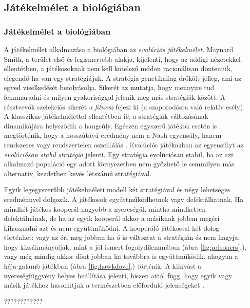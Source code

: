 \subsection{Játékelmélet a biológiában}
\begin{frame}
\frametitle{Játékelmélet a biológiában}
A játékelmélet alkalmazása a biológiában az \textit{evolúciós játékelmélet}. Maynard Smith, a terület első és legismertebb alakja, kijelenti, hogy az addigi nézetekkel ellentétben, a játékosoknak nem kell kötelező módon racionálisan dönteniük, elegendő ha van egy stratégiájuk. A stratégia genetikailag örökölt jelleg, ami az egyed viselkedését befolyásolja. Sikerét az mutatja, hogy mennyire tud fennmaradni és milyen gyakorisággal jelenik meg más stratégiák között. A résztvevők szelekciós sikerét a \textit{fitnesz} fejezi ki (a szaporodásra való relatív esély). A klasszikus játékelmélettel ellentétben itt a stratégiák változásának dinamikájára helyeződik a hangsúly. Egészen egyszerű játékok esetén is megtörténik, hogy a hosszútávú eredmény nem a Nash-egyensúly, hanem rendszeres vagy rendszertelen oszcillálás \cite{nowak2004evolutionary}. Evolúciós játékokban az egyensúlyt az \textit{evolúciósan stabil stratégia} jelenti. Egy stratégia evolúciósan stabil, ha az azt alkalmazó populáció egy adott környezetben nem győzhető le semmilyen más alternatív, kezdetben kevés létszámú stratégiával.
 
Egyik legegyszerűbb játékelméleti modell két stratégiával és négy lehetséges eredménnyel dolgozik. A játékosok együttműködhetnek vagy defektálhatnak. Ha mindkét játékos kooperál nagyobb a nyereségük mintha mindketten defektálnának, de ha az egyik kooperál akkor a másiknak jobban megéri kihasználni azt és nem együttműködni. A kooperáló játékossal két dolog történhet: vagy az éri meg jobban ha ő is változtat a stratégián és nem hagyja, hogy kizsákmányolják, mint a jól ismert fogolydilemmában (ábra \ref{fig:prisoners}.), vagy még mindig akkor dönt jobban ha továbbra is együttműködik, ahogyan a héja-galamb játékban (ábra \ref{fig:hawkdove}.) történik. A kihívást a nyereségfüggvény helyes beállítása jelenti, hiszen attól függ, hogy egyik vagy másik játékhoz hasonlítjuk a természetben előforduló jelenségeket \cite{nowak2004evolutionary}.
 
????????????
\end{frame}


